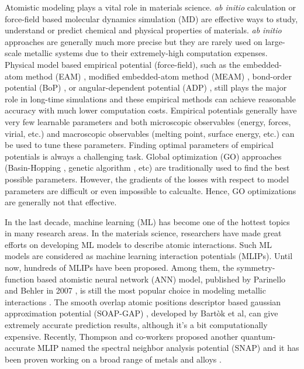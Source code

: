 \documentclass[prb,reprint]{revtex4-2}
\begin{document}
Atomistic modeling plays a vital role in materials science. \textit{ab initio} 
calculation or force-field based molecular dynamics simulation (MD) are 
effective ways to study, understand or predict chemical and physical properties 
of materials. \textit{ab initio} approaches are generally much more precise but 
they are rarely used on large-scale metallic systems due to their extremely-high 
computation expenses. Physical model based empirical potential (force-field), 
such as the embedded-atom method (EAM) \cite{EAM0,EAM1,EAM2,EAM3,EAM4}, 
modified embedded-atom method (MEAM) \cite{MEAM0,MEAM1,MEAM2,MEAM_Jelinek}, 
bond-order potential (BoP) \cite{BOP0,BOP1,BOP2,BOP3}, or angular-dependent 
potential (ADP) \cite{ADP0,ADP1,ADP2,ADP3,ADP_FeNi}, still plays the major role 
in long-time simulations and these empirical methods can achieve reasonable 
accuracy with much lower computation costs. Empirical potentials 
generally have very few learnable parameters and both microscopic observables 
(energy, forces, virial, etc.) and macroscopic observables (melting 
point, surface energy, etc.) can be used to tune these parameters. Finding 
optimal parameters of empirical potentials is always a challenging task. Global 
optimization (GO) approaches (Basin-Hopping \cite{BH0,BH1}, genetic algorithm 
\cite{PCIPY,PGA}, etc) are traditionally used to find the best possible 
parameters. However, the gradients of the losses with respect to model 
parameters are difficult or even impossible to calcualte. Hence, 
GO optimizations are generally not that effective.

In the last decade, machine learning (ML) has become one of the hottest 
topics in many research areas. In the materials science, researchers have made 
great efforts on developing ML models to describe atomic interactions. Such ML 
models are considered as machine learning interaction potentials (MLIPs). Until 
now, hundreds of MLIPs have been proposed. Among them, the symmetry-function 
based atomistic neural network (ANN) model, published by Parinello and Behler in 
2007 \cite{SF2007,SF1,SF2,SF3,SF4}, is still the most popular choice in modeling 
metallic interactions \cite{SFApp0,SFApp1,SFApp2}. 
The smooth overlap atomic positions descriptor based gaussian approximation 
potential (SOAP-GAP) \cite{soap0,soap1,soap2,soap3}, developed by Bartòk et al, 
can give extremely accurate prediction results, although it's a bit 
computationally expensive. 
Recently, Thompson and co-workers proposed another quantum-accurate MLIP named 
the spectral neighbor analysis potential (SNAP) \cite{SNAP_Algo} and it has 
been proven working on a broad range of metals and 
alloys \cite{SNAP_Mo,SNAP,SNAP_New}.
\end{document}
